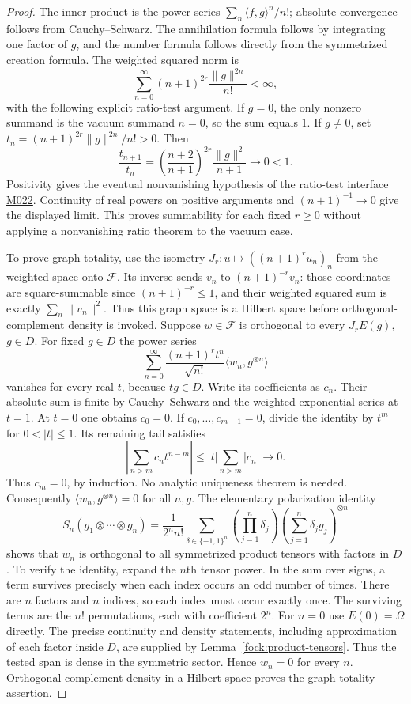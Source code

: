 \documentclass[11pt,a4paper]{article}
\theoremstyle{definition}
\theoremstyle{remark}
\begin{document}
\begin{proof}
The inner product is the power series
$\sum_n\langle f,g\rangle^n/n!$; absolute convergence follows from
Cauchy--Schwarz. The annihilation formula follows by integrating one
factor of $g$, and the number formula follows directly from the
symmetrized creation formula. The weighted squared norm is
\[
 \sum_{n=0}^{\infty}(n+1)^{2r}\frac{\|g\|^{2n}}{n!}<\infty,
\]
with the following explicit ratio-test argument. If $g=0$, the
only nonzero summand is the vacuum summand $n=0$, so the sum equals
$1$. If $g\ne0$, set
$t_n=(n+1)^{2r}\|g\|^{2n}/n!>0$. Then
\[
 \frac{t_{n+1}}{t_n}
 =\left(\frac{n+2}{n+1}\right)^{2r}
        \frac{\|g\|^2}{n+1}\longrightarrow0<1.
\]
Positivity gives the eventual nonvanishing hypothesis of the
ratio-test interface \hyperref[base:M022]{M022}. Continuity of real
powers on positive arguments and $(n+1)^{-1}\to0$ give the displayed
limit. This proves summability for each fixed $r\geq0$ without
applying a nonvanishing ratio theorem to the vacuum case.

To prove graph totality, use the isometry
$J_r:u\mapsto((n+1)^ru_n)_n$ from the weighted space onto $\mathcal F$.
Its inverse sends $v_n$ to $(n+1)^{-r}v_n$: those coordinates are
square-summable since $(n+1)^{-r}\leq1$, and their weighted squared
sum is exactly $\sum_n\|v_n\|^2$. Thus this graph space is a Hilbert
space before orthogonal-complement density is invoked.
Suppose $w\in\mathcal F$ is orthogonal to every $J_rE(g)$, $g\in D$.
For fixed $g\in D$ the power series
\[
 \sum_{n=0}^{\infty}\frac{(n+1)^r t^n}{\sqrt{n!}}
                         \langle w_n,g^{\otimes n}\rangle
\]
vanishes for every real $t$, because $tg\in D$.
Write its coefficients as $c_n$. Their absolute sum is finite by
Cauchy--Schwarz and the weighted exponential series at $t=1$.
At $t=0$ one obtains $c_0=0$. If $c_0,\ldots,c_{m-1}=0$, divide
the identity by $t^m$ for $0<|t|\leq1$. Its remaining tail satisfies
\[
 \left|\sum_{n>m}c_nt^{n-m}\right|
       \leq |t|\sum_{n>m}|c_n|\longrightarrow0.
\]
Thus $c_m=0$, by induction. No analytic uniqueness theorem is needed.
Consequently
$\langle w_n,g^{\otimes n}\rangle=0$ for all $n,g$.
The elementary polarization identity
\[
 S_n(g_1\otimes\cdots\otimes g_n)
 =\frac1{2^n n!}\sum_{\delta\in\{-1,1\}^n}
       \left(\prod_{j=1}^n\delta_j\right)
       \left(\sum_{j=1}^n\delta_jg_j\right)^{\otimes n}
\]
shows that $w_n$ is orthogonal to all symmetrized product tensors with
factors in $D$. To verify the identity, expand the $n$th tensor
power. In the sum over signs, a term survives precisely when each
index occurs an odd number of times. There are $n$ factors and $n$
indices, so each index must occur exactly once. The surviving terms
are the $n!$ permutations, each with coefficient $2^n$.
For $n=0$ use $E(0)=\Omega$ directly. The precise continuity and
density statements, including approximation of each factor inside
$D$, are supplied by Lemma~\ref{fock:product-tensors}. Thus the
tested span is dense in the symmetric sector. Hence $w_n=0$ for
every $n$. Orthogonal-complement density in a
Hilbert space proves the graph-totality assertion.


\end{proof}
\end{document}
